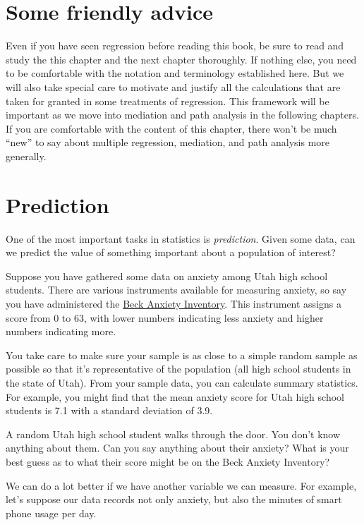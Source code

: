 \documentclass[
]{book}
\begin{document}
\hypertarget{simple-advice}{%
\section{Some friendly advice}\label{simple-advice}}

Even if you have seen regression before reading this book, be sure to read and study the this chapter and the next chapter thoroughly. If nothing else, you need to be comfortable with the notation and terminology established here. But we will also take special care to motivate and justify all the calculations that are taken for granted in some treatments of regression. This framework will be important as we move into mediation and path analysis in the following chapters. If you are comfortable with the content of this chapter, there won't be much ``new'' to say about multiple regression, mediation, and path analysis more generally.

\hypertarget{simple-prediction}{%
\section{Prediction}\label{simple-prediction}}

One of the most important tasks in statistics is \emph{prediction}. Given some data, can we predict the value of something important about a population of interest?

Suppose you have gathered some data on anxiety among Utah high school students. There are various instruments available for measuring anxiety, so say you have administered the \href{https://en.wikipedia.org/wiki/Beck_Anxiety_Inventory}{Beck Anxiety Inventory}. This instrument assigns a score from 0 to 63, with lower numbers indicating less anxiety and higher numbers indicating more.

You take care to make sure your sample is as close to a simple random sample as possible so that it's representative of the population (all high school students in the state of Utah). From your sample data, you can calculate summary statistics. For example, you might find that the mean anxiety score for Utah high school students is 7.1 with a standard deviation of 3.9.

A random Utah high school student walks through the door. You don't know anything about them. Can you say anything about their anxiety? What is your best guess as to what their score might be on the Beck Anxiety Inventory?

We can do a lot better if we have another variable we can measure. For example, let's suppose our data records not only anxiety, but also the minutes of smart phone usage per day.
\end{document}
